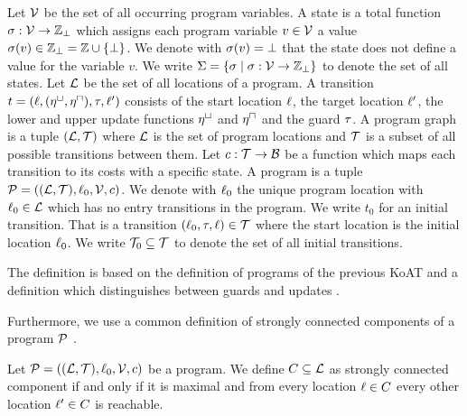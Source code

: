 \begin{definition}[Program] 
  Let $\mathcal{V}$ be the set of all occurring program variables.
  A state is a total function $\sigma: \mathcal{V} \rightarrow \mathbb{Z}_\bot$ which assigns each program variable $v \in \mathcal{V}$ a value $\sigma(v) \in \mathbb{Z}_\bot = \mathbb{Z} \cup \lbrace \bot \rbrace$.
  We denote with $\sigma(v) = \bot$ that the state does not define a value for the variable $v$.
  We write $\Sigma = \lbrace  \sigma \mid \sigma: \mathcal{V} \rightarrow \mathbb{Z}_\bot \rbrace$ to denote the set of all states.
  Let $\mathcal{L}$ be the set of all locations of a program.
  A transition $t = (\ell, (\eta^\sqcup, \eta^\sqcap), \tau, \ell')$ consists of the start location $\ell$, the target location $\ell'$, the lower and upper update functions $\eta^\sqcup$ and $\eta^\sqcap$ and the guard $\tau$. 
  A program graph is a tuple $(\mathcal{L}, \mathcal{T})$ where $\mathcal{L}$ is the set of program locations and $\mathcal{T}$ is a subset of all possible transitions between them.
  Let $c: \mathcal{T} \rightarrow \mathcal{B}$ be a function which maps each transition to its costs with a specific state.
  A program is a tuple $\mathcal{P} = ((\mathcal{L}, \mathcal{T}), \ell_0, \mathcal{V}, c)$.
  We denote with $\ell_0$ the unique program location with $\ell_0 \in \mathcal{L}$ which has no entry transitions in the program.
  We write $t_0$ for an initial transition. That is a transition $(\ell_0, \tau, \ell) \in \mathcal{T}$ where the start location is the initial location $\ell_0$.
  We write $\mathcal{T}_0 \subseteq \mathcal{T}$ to denote the set of all initial transitions.
\end{definition}
The definition is based on the definition of programs of the previous KoAT \cite{koat} and a definition which distinguishes between guards and updates \cite{lowerruntime}.

Furthermore, we use a common definition of strongly connected components of a program $\mathcal{P}$ \cite{sccs}.

\begin{definition}
  Let $\mathcal{P} = ((\mathcal{L}, \mathcal{T}), \ell_0, \mathcal{V}, c)$ be a program.
  We define $C \subseteq \mathcal{L}$ as strongly connected component if and only if it is maximal and from every location $\ell \in C$ every other location $\ell' \in C$ is reachable.
\end{definition}

